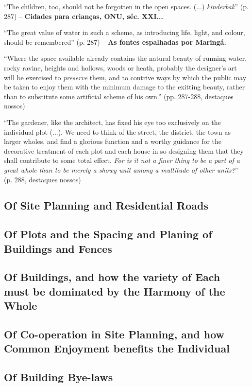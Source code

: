 \documentclass[12pt, a4paper]{book} %
\begin{document}
        ``The children, too, should not be forgotten in the open spaces. (...) \textit{kinderbak}'' (p. 287) – \textbf{Cidades para crianças, ONU, séc. XXI...}

        ``The great value of water in such a scheme, as introducing life, light, and colour, should be remembered'' (p. 287) – \textbf{As fontes espalhadas por Maringá.}

        ``Where the space available already contains the natural beauty of running water, rocky ravine, heights and hollows, woods or heath, probably the designer's art will be exercised to \textit{preserve} them, and to contrive ways by which the public may be taken to enjoy them with the minimum damage to the exitting beauty, rather than to substitute some artificial scheme of his own.'' (pp. 287-288, destaques nossos)

        ``The gardener, like the architect, has fixed his eye too exclusively on the individual plot (...). We need to think of the street, the district, the town as larger wholes, and find a glorious function and a worthy guidance for the decorative treatment of each plot and each house in so designing them that they shall contribute to some total effect. \textit{For is it not a finer thing to be a part of a great whole than to be merely a showy unit among a multitude of other units?}'' (p. 288, destaques nossos)



        \subsection*{Of Site Planning and Residential Roads}
        \subsection*{Of Plots and the Spacing and Planing of Buildings and Fences}
        \subsection*{Of Buildings, and how the variety of Each must be dominated by the Harmony of the Whole}
        \subsection*{Of Co-operation in Site Planning, and how Common Enjoyment benefits the Individual}
        \subsection*{Of Building Bye-laws}
\end{document}
